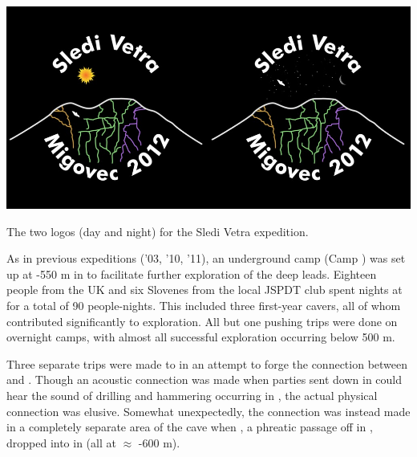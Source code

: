 \begin{pagefigure}
\checkoddpage \ifoddpage \forcerectofloat \else \forceversofloat \fi
   \centering
\includegraphics[width = \textwidth]{2012/summary/2012-01-29_print_res_both-png-scaled-1000.jpg}
\caption{The two logos (day and night) for the Sledi Vetra expedition. } \label{2012 logos}
\end{pagefigure}


As in previous expeditions ('03, '10, '11), an underground camp (Camp
) was set up at -550 m in  to facilitate
further exploration of the deep leads. Eighteen people from the UK and
six Slovenes from the local JSPDT club spent nights at  for
a total of 90 people-nights. This included three first-year cavers, all
of whom contributed significantly to exploration. All but one pushing
trips were done on overnight camps, with almost all successful
exploration occurring below 500 m.

Three separate trips were made to  in an attempt to
forge the connection between  and . Though an
acoustic connection was made when parties sent down  in
 could hear the sound of drilling and hammering
occurring in , the actual physical connection was
elusive. Somewhat unexpectedly, the connection was instead made in a
completely separate area of the cave when , a
phreatic passage off  in ,
dropped into  in  (all at $\approx$ -600 m).

